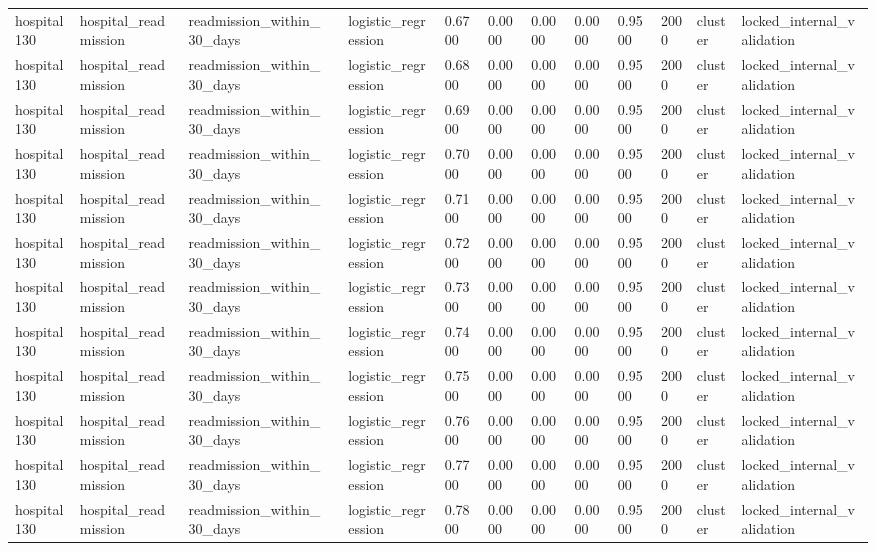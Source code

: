 \begin{tabular}{lllllllllllll}
hospital130 & hospital\_readmission & readmission\_within\_30\_days &  & logistic\_regression & 0.6700 & 0.0000 & 0.0000 & 0.0000 & 0.9500 & 2000 & cluster & locked\_internal\_validation \\
hospital130 & hospital\_readmission & readmission\_within\_30\_days &  & logistic\_regression & 0.6800 & 0.0000 & 0.0000 & 0.0000 & 0.9500 & 2000 & cluster & locked\_internal\_validation \\
hospital130 & hospital\_readmission & readmission\_within\_30\_days &  & logistic\_regression & 0.6900 & 0.0000 & 0.0000 & 0.0000 & 0.9500 & 2000 & cluster & locked\_internal\_validation \\
hospital130 & hospital\_readmission & readmission\_within\_30\_days &  & logistic\_regression & 0.7000 & 0.0000 & 0.0000 & 0.0000 & 0.9500 & 2000 & cluster & locked\_internal\_validation \\
hospital130 & hospital\_readmission & readmission\_within\_30\_days &  & logistic\_regression & 0.7100 & 0.0000 & 0.0000 & 0.0000 & 0.9500 & 2000 & cluster & locked\_internal\_validation \\
hospital130 & hospital\_readmission & readmission\_within\_30\_days &  & logistic\_regression & 0.7200 & 0.0000 & 0.0000 & 0.0000 & 0.9500 & 2000 & cluster & locked\_internal\_validation \\
hospital130 & hospital\_readmission & readmission\_within\_30\_days &  & logistic\_regression & 0.7300 & 0.0000 & 0.0000 & 0.0000 & 0.9500 & 2000 & cluster & locked\_internal\_validation \\
hospital130 & hospital\_readmission & readmission\_within\_30\_days &  & logistic\_regression & 0.7400 & 0.0000 & 0.0000 & 0.0000 & 0.9500 & 2000 & cluster & locked\_internal\_validation \\
hospital130 & hospital\_readmission & readmission\_within\_30\_days &  & logistic\_regression & 0.7500 & 0.0000 & 0.0000 & 0.0000 & 0.9500 & 2000 & cluster & locked\_internal\_validation \\
hospital130 & hospital\_readmission & readmission\_within\_30\_days &  & logistic\_regression & 0.7600 & 0.0000 & 0.0000 & 0.0000 & 0.9500 & 2000 & cluster & locked\_internal\_validation \\
hospital130 & hospital\_readmission & readmission\_within\_30\_days &  & logistic\_regression & 0.7700 & 0.0000 & 0.0000 & 0.0000 & 0.9500 & 2000 & cluster & locked\_internal\_validation \\
hospital130 & hospital\_readmission & readmission\_within\_30\_days &  & logistic\_regression & 0.7800 & 0.0000 & 0.0000 & 0.0000 & 0.9500 & 2000 & cluster & locked\_internal\_validation \\

\end{tabular}
